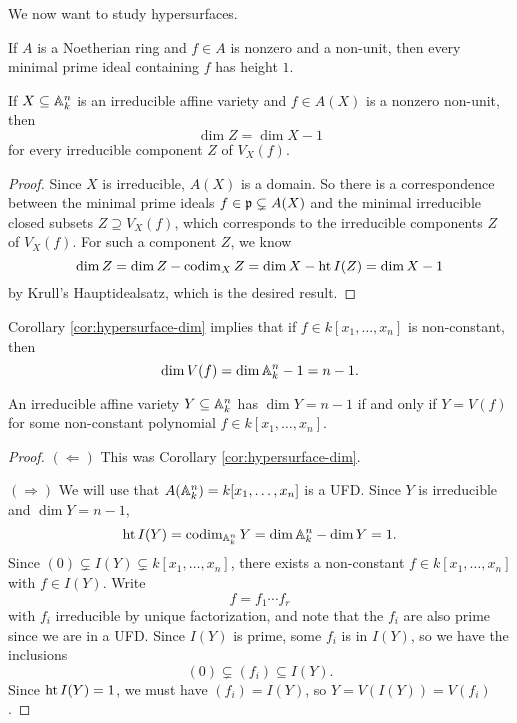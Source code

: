\begin{remark}
  We now want to study hypersurfaces.
\end{remark}

\begin{theorem}
  If $A$ is a Noetherian ring and
  $f \in A$ is nonzero and a non-unit,
  then every minimal prime ideal containing
  $f$ has height $1$.
\end{theorem}

\begin{corollary}\label{cor:hypersurface-dim}
  If $X \subseteq \mathbb{A}_k^n$ is an
  irreducible affine variety and
  $f \in A(X)$ is a nonzero non-unit, then
  \[
    \dim Z = \dim X - 1
  \]
  for every irreducible component
  $Z$ of $V_X(f)$.
\end{corollary}

\begin{proof}
  Since $X$ is irreducible, $A(X)$ is a
  domain. So there is a correspondence
  between the minimal prime ideals
  $f \in \mathfrak{p} \subsetneq A(X)$ and the
  minimal irreducible closed subsets
  $Z \supseteq V_X(f)$, which corresponds
  to the irreducible components
  $Z$ of $V_X(f)$. For such a component
  $Z$, we know
  \[
    \dim Z = \dim Z - \operatorname{codim}_X Z
    = \dim X - \operatorname{ht} I(Z)
    = \dim X - 1
  \]
  by Krull's Hauptidealsatz, which is
  the desired result.
\end{proof}

\begin{example}
  Corollary \ref{cor:hypersurface-dim} implies that if
  $f \in k[x_1, \dots, x_n]$ is
  non-constant, then
  \[
    \dim V(f) = \dim \mathbb{A}_k^n - 1
    = n - 1.
  \]
\end{example}

\begin{theorem}
  An irreducible affine variety
  $Y \subseteq \mathbb{A}_k^n$ has
  $\dim Y = n - 1$ if and only if
  $Y = V(f)$ for some non-constant
  polynomial $f \in k[x_1, \dots, x_n]$.
\end{theorem}

\begin{proof}
  $(\Leftarrow)$ This
  was Corollary \ref{cor:hypersurface-dim}.

  $(\Rightarrow)$ We will use that
  $A(\mathbb{A}_k^n) = k[x_1, \dots, x_n]$
  is a UFD. Since $Y$ is irreducible
  and $\dim Y = n - 1$,
  \[
    \operatorname{ht} I(Y)
    = \operatorname{codim}_{\mathbb{A}_k^n} Y
    = \dim \mathbb{A}_k^n - \dim Y
    = 1.
  \]
  Since $(0) \subsetneq I(Y) \subsetneq k[x_1, \dots, x_n]$,
  there exists a non-constant
  $f \in k[x_1, \dots, x_n]$ with
  $f \in I(Y)$. Write
  \[
    f = f_1 \cdots f_r
  \]
  with $f_i$ irreducible by
  unique factorization, and note that
  the $f_i$ are also prime since we are in
  a UFD. Since $I(Y)$ is prime,
  some $f_i$ is in $I(Y)$, so we have
  the inclusions
  \[
    (0) \subsetneq (f_i) \subseteq I(Y).
  \]
  Since $\operatorname{ht} I(Y) = 1$, we must have
  $(f_i) = I(Y)$, so
  $Y = V(I(Y)) = V(f_i)$.
\end{proof}

